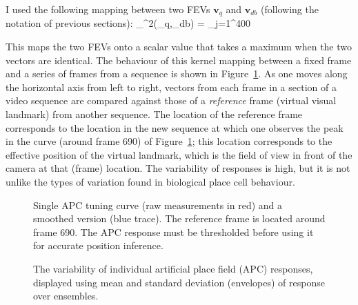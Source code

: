 I used the following mapping between two FEVs $\mathbf{v}_q$ and $\mathbf{v}_{db}$ (following the notation of previous sections):
\be
\kappa_{\chi^2}(_q,_{db}) = \sum_{j=1}^{400}
\ee

This maps the two FEVs onto a scalar value that takes a maximum when the two vectors are identical. The behaviour of this kernel mapping between a fixed frame and a series of frames from a sequence is shown in Figure~\ref{fig:APCSingleNoisy}.  As one moves along the horizontal axis from left to right, vectors from each frame in a section of a video sequence are compared against those of a {\em reference} frame (virtual visual landmark) from another sequence.  The location of the reference frame corresponds to the location in the new sequence at which one observes the peak in the curve (around frame 690) of Figure~\ref{fig:APCSingleNoisy}; this location corresponds to the effective position of the virtual landmark, which is the field of view in front of the camera at that (frame) location.  The variability of responses is high, but it is not unlike the types of variation found in biological place cell behaviour.  


%		

\begin{figure}[t]
\centering
 \setlength{}
	\setlength{}
		
\caption{Single APC tuning curve (raw measurements in red) and a smoothed version (blue trace).  The reference frame is located around frame 690. The APC response must be thresholded before using it for accurate position inference.}
\label{fig:APCSingleNoisy}
\end{figure}


\begin{figure}
  \centering
  \setlength{}
  \setlength{}
  
  \caption{The variability of individual artificial place field (APC) responses, displayed using mean and standard deviation (envelopes) of response over ensembles.}
  \label{fig:APCVariability}
\end{figure}




